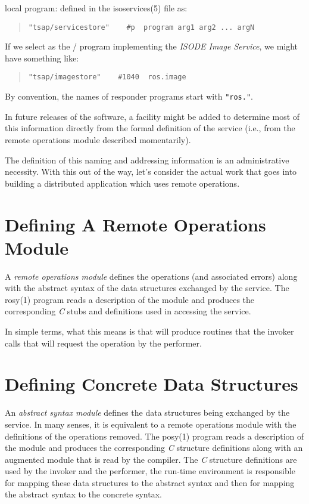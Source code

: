 \begin{describe}
\item[local program:] defined in the \man isoservices(5) file as:
\begin{quote}\small\begin{verbatim}
"tsap/servicestore"    #p  program arg1 arg2 ... argN
\end{verbatim}\end{quote}
If we select  as the \unix/ program implementing the {\em ISODE
Image Service},
we might have something like:
\begin{quote}\small\begin{verbatim}
"tsap/imagestore"    #1040  ros.image
\end{verbatim}\end{quote}
\end{describe}
By convention,
the names of responder programs start with \verb+"ros."+.

In future releases of the software,
a facility might be added to determine most of this information directly
from the formal definition of the service
(i.e., from the remote operations module described momentarily).

The definition of this naming and addressing information is an administrative
necessity.
With this out of the way,
let's consider the actual work that goes into building a distributed
application which uses remote operations.

\section	{Defining A Remote Operations Module}
A {\em remote operations module\/} defines the operations
(and associated errors) along with the abstract syntax of the data structures
exchanged by the service.
The \man rosy(1) program reads a description of the module and produces the
corresponding {\em C\/} stubs and definitions used in accessing the service.

In simple terms,
what this means is that  will produce routines that
the invoker calls that will request the operation by the performer.

\section	{Defining Concrete Data Structures}
An {\em abstract syntax module\/} defines the data structures being exchanged
by the service.
In many senses,
it is equivalent to a remote operations module with the definitions of the
operations removed.
The \man posy(1) program reads a description of the module and produces the
corresponding {\em C\/} structure definitions along with an augmented module
that is read by the  compiler.
The {\em C\/} structure definitions are used by the invoker and the
performer,
the run-time environment is responsible for mapping these data structures to
the abstract syntax and then for mapping the abstract syntax to the concrete
syntax.

